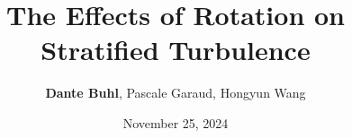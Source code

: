 \documentclass[aspecttatio=169]{beamer}
\title{The Effects of Rotation on Stratified Turbulence}
\author[Dante Buhl]{\small \textbf{Dante Buhl}, Pascale Garaud, Hongyun Wang}}
\date{November 25, 2024}
\institute{UCSC Applied Mathematics}
\begin{document}
\newcommand{\wrms}{w_{\text{rms}}}
\newcommand{\bs}[1]{\boldsymbol{#1}}
\newcommand{\tb}[1]{\textbf{#1}}
\newcommand{\bmp}[1]{\begin{minipage}{#1\textwidth}}
\newcommand{\emp}{\end{minipage}}
\newcommand{\R}{\mathbb{R}}
\newcommand{\C}{\mathbb{C}}
\newcommand{\N}{\mathcal{N}}
\newcommand{\K}{\bs{\mathrm{K}}}
\newcommand{\m}{\bs{\mu}_*}
\newcommand{\s}{\bs{\Sigma}_*}
\newcommand{\dt}{\Delta t}
\newcommand{\dx}{\Delta x}
\newcommand{\tr}[1]{\text{Tr}(#1)}
\newcommand{\Tr}[1]{\text{Tr}(#1)}
\newcommand{\Div}{\nabla \cdot}
\renewcommand{\div}{\nabla \cdot}
\newcommand{\Curl}{\nabla \times}
\newcommand{\Grad}{\nabla}
\newcommand{\grad}{\nabla}
\newcommand{\grads}{\nabla_s}
\newcommand{\gradf}{\nabla_f}
\newcommand{\xs}{\bs{x}_s}
\newcommand{\xf}{\bs{x}_f}
\newcommand{\ts}{t_s}
\newcommand{\tf}{t_f}
\newcommand{\pt}{\partial t}
\newcommand{\pz}{\partial z}
\newcommand{\uvec}{\bs{u}}
\newcommand{\F}{\bs{F}}
\newcommand{\T}{\tilde{T}}
\newcommand{\ez}{\bs{e}_z}
\newcommand{\ex}{\bs{e}_x}
\newcommand{\ey}{\bs{e}_y}
\newcommand{\eo}{\bs{e}_{\bs{\Omega}}}
\newcommand{\ppt}[1]{\frac{\partial #1}{\partial t}}
\newcommand{\ppts}[1]{\frac{\partial #1}{\partial t_s}}
\newcommand{\pptf}[1]{\frac{\partial #1}{\partial t_f}}
\newcommand{\ppz}[1]{\frac{\partial #1}{\partial z}}
\newcommand{\ddz}[1]{\frac{d #1}{d z}}
\newcommand{\ppzetas}[1]{\frac{\partial^2 #1}{\partial \zeta^2}}
\newcommand{\ppzs}[1]{\frac{\partial #1}{\partial z_s}}
\newcommand{\ppzf}[1]{\frac{\partial #1}{\partial z_f}}
\newcommand{\ppx}[1]{\frac{\partial #1}{\partial x}}
\newcommand{\ppy}[1]{\frac{\partial #1}{\partial y}}
\newcommand{\ppzeta}[1]{\frac{\partial #1}{\partial \zeta}}

\frame{\titlepage}
\end{document}
